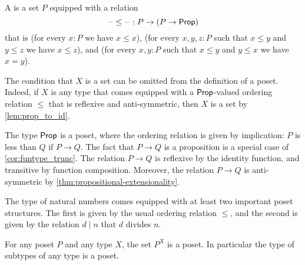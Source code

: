\begin{defn}
  A  is a set $P$ equipped with a relation
  \begin{equation*}
    \mathord{\hspace{1pt}\text{--}\hspace{1pt}}\leq\mathord{\hspace{1pt}\text{--}\hspace{1pt}} : P \to (P \to \mathsf{Prop})
  \end{equation*}
  that is  (for every $x:P$ we have $x\leq x$),  (for every $x,y,z:P$ such that $x\leq y$ and $y\leq z$ we have $x\leq z$), and  (for every $x,y:P$ such that $x\leq y$ and $y\leq x$ we have $x=y$).
\end{defn}

\begin{rmk}
  The condition that $X$ is a set can be omitted from the definition of a poset. Indeed, if $X$ is any type that comes equipped with a $\mathsf{Prop}$-valued ordering relation $\leq$ that is reflexive and anti-symmetric, then $X$ is a set by \cref{lem:prop_to_id}.
\end{rmk}

\begin{eg}
  The type $\mathsf{Prop}$ is a poset, where the ordering relation is given by implication: $P$ is less than $Q$ if $P\to Q$. The fact that $P\to Q$ is a proposition is a special case of \cref{cor:funtype_trunc}. The relation $P\to Q$ is reflexive by the identity function, and transitive by function composition. Moreover, the relation $P\to Q$ is anti-symmetric by \cref{thm:propositional-extensionality}.
\end{eg}

\begin{eg}
  The type of natural numbers comes equipped with at least two important poset structures. The first is given by the usual ordering relation $\leq$, and the second is given by the relation $d\mid n$ that $d$ divides $n$.
\end{eg}

\begin{thm}
  For any poset $P$ and any type $X$, the set $P^X$ is a poset. In particular the type of subtypes of any type is a poset.
\end{thm}

